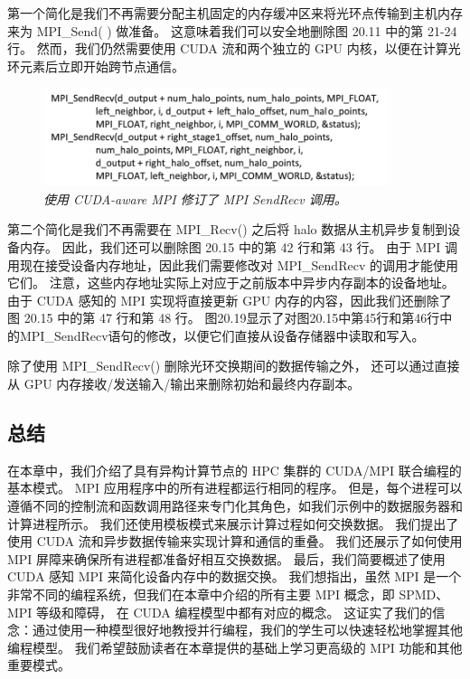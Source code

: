 第一个简化是我们不再需要分配主机固定的内存缓冲区来将光环点传输到主机内存来为 MPI\_Send( ) 做准备。 
这意味着我们可以安全地删除图 20.11 中的第 21-24 行。 
然而，我们仍然需要使用 CUDA 流和两个独立的 GPU 内核，以便在计算光环元素后立即开始跨节点通信。

\begin{figure}[H]
	\centering
	\includegraphics[width=0.9\textwidth]{figs/F20.19.png}
	\caption{\textit{使用 CUDA-aware MPI 修订了 MPI SendRecv 调用。}}
\end{figure}

第二个简化是我们不再需要在 MPI\_Recv() 之后将 halo 数据从主机异步复制到设备内存。 
因此，我们还可以删除图 20.15 中的第 42 行和第 43 行。 
由于 MPI 调用现在接受设备内存地址，因此我们需要修改对 MPI\_SendRecv 的调用才能使用它们。 
注意，这些内存地址实际上对应于之前版本中异步内存副本的设备地址。 
由于 CUDA 感知的 MPI 实现将直接更新 GPU 内存的内容，因此我们还删除了图 20.15 中的第 47 行和第 48 行。 
图20.19显示了对图20.15中第45行和第46行中的MPI\_SendRecv语句的修改，以便它们直接从设备存储器中读取和写入。

除了使用 MPI\_SendRecv() 删除光环交换期间的数据传输之外，
还可以通过直接从 GPU 内存接收/发送输入/输出来删除初始和最终内存副本。

\subsection{总结}
在本章中，我们介绍了具有异构计算节点的 HPC 集群的 CUDA/MPI 联合编程的基本模式。 
MPI 应用程序中的所有进程都运行相同的程序。 
但是，每个进程可以遵循不同的控制流和函数调用路径来专门化其角色，如我们示例中的数据服务器和计算进程所示。 
我们还使用模板模式来展示计算过程如何交换数据。 我们提出了使用 CUDA 流和异步数据传输来实现计算和通信的重叠。 
我们还展示了如何使用 MPI 屏障来确保所有进程都准备好相互交换数据。 
最后，我们简要概述了使用 CUDA 感知 MPI 来简化设备内存中的数据交换。 
我们想指出，虽然 MPI 是一个非常不同的编程系统，但我们在本章中介绍的所有主要 MPI 概念，即 SPMD、MPI 等级和障碍，
在 CUDA 编程模型中都有对应的概念。 
这证实了我们的信念：通过使用一种模型很好地教授并行编程，我们的学生可以快速轻松地掌握其他编程模型。 
我们希望鼓励读者在本章提供的基础上学习更高级的 MPI 功能和其他重要模式。
